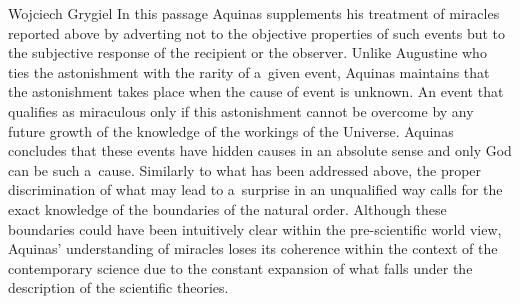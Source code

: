 \begin{artengenv}{Wojciech Grygiel}
In this passage Aquinas supplements his treatment of miracles reported above by adverting not to the objective properties of such events but to the subjective response of the recipient or the observer. Unlike Augustine who ties the astonishment with the rarity of a~given event, Aquinas maintains that the astonishment takes place when the cause of event is unknown. An event that qualifies as miraculous only if this astonishment cannot be overcome by any future growth of the knowledge of the workings of the Universe. Aquinas concludes that these events have hidden causes in an absolute sense and only God can be such a~cause. Similarly to what has been addressed above, the proper discrimination of what may lead to a~surprise in an unqualified way calls for the exact knowledge of the boundaries of the natural order. Although these boundaries could have been intuitively clear within the pre-scientific world view, Aquinas’ understanding of miracles loses its coherence within the context of the contemporary science due to the constant expansion of what falls under the description of the scientific theories.


\end{artengenv}
